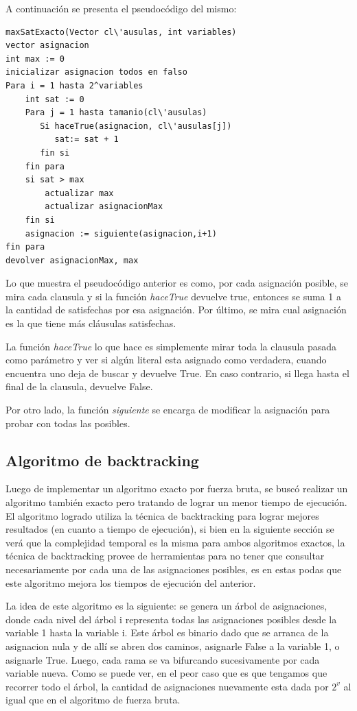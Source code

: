 \documentclass[a4paper,10pt]{article}
\begin{document}
A continuaci\'on se presenta el pseudoc\'odigo del mismo:

\begin{verbatim}
maxSatExacto(Vector cl\'ausulas, int variables)
vector asignacion
int max := 0
inicializar asignacion todos en falso
Para i = 1 hasta 2^variables
    int sat := 0
    Para j = 1 hasta tamanio(cl\'ausulas)
       Si haceTrue(asignacion, cl\'ausulas[j])
          sat:= sat + 1
       fin si
    fin para
    si sat > max
        actualizar max
        actualizar asignacionMax
    fin si
    asignacion := siguiente(asignacion,i+1)
fin para
devolver asignacionMax, max
\end{verbatim}

Lo que muestra el pseudoc\'odigo anterior es como, por cada asignaci\'on posible, se mira cada clausula y si la funci\'on \emph{haceTrue} devuelve true, entonces se suma 1 a la cantidad de satisfechas por esa asignaci\'on. Por \'ultimo, se mira cual asignaci\'on es la que tiene m\'as cl\'ausulas satisfechas.

La funci\'on \emph{haceTrue} lo que hace es simplemente mirar toda la clausula pasada como par\'ametro y ver si alg\'un literal esta asignado como verdadera, cuando encuentra uno deja de buscar y devuelve True. En caso contrario, si llega hasta el final de la clausula, devuelve False. 

Por otro lado, la funci\'on \emph{siguiente} se encarga de modificar la asignaci\'on para probar con todas las posibles.

\subsection*{Algoritmo de backtracking}

Luego de implementar un algoritmo exacto por fuerza bruta, se busc\'o realizar un algoritmo tambi\'en exacto pero tratando de lograr un menor tiempo de ejecuci\'on. El algoritmo logrado utiliza la t\'ecnica de backtracking para lograr mejores resultados (en cuanto a tiempo de ejecuci\'on), si bien en la siguiente secci\'on se ver\'a que la complejidad temporal es la misma para ambos algoritmos exactos, la t\'ecnica de backtracking provee de herramientas para no tener que consultar necesariamente por cada una de las asignaciones posibles, es en estas podas que este algoritmo mejora los tiempos de ejecuci\'on del anterior.

\bigskip

La idea de este algoritmo es la siguiente: se genera un \'arbol de asignaciones, donde cada nivel del \'arbol i representa todas las asignaciones posibles desde la variable 1 hasta la variable i. Este \'arbol es binario dado que se arranca de la asignacion nula y de all\'i se abren dos caminos, asignarle False a la variable 1, o asignarle True. Luego, cada rama se va bifurcando sucesivamente por cada variable nueva. Como se puede ver, en el peor caso que es que tengamos que recorrer todo el \'arbol, la cantidad de asignaciones nuevamente esta dada por $2^{v}$ al igual que en el algoritmo de fuerza bruta.
\end{document}
